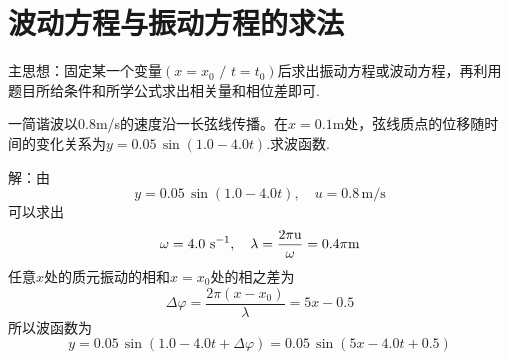 \section{波动方程与振动方程的求法}
主思想：固定某一个变量$(x=x_0\,\,/\,\,t=t_0)$后求出振动方程或波动方程，再利用题目所给条件和所学公式求出相关量和相位差即可.\jg
\par \dya[例1] 一简谐波以0.8m/s的速度沿一长弦线传播。在$x=0.1$m处，弦线质点的位移随时间的变化关系为$y=0.05\,\sin (1.0-4.0t)$.求波函数.\jg\jg 
\par 解：由
\begin{equation*}
y=0.05\,\sin (1.0-4.0t),\quad u=0.8\,\text{m/s}
\end{equation*}
可以求出
\begin{equation*}
\omega = 4.0\,\,\rm{s}^{-1},\quad \lambda = \frac{2\pi u}{\omega}=0.4\pi \rm{m}
\end{equation*}
任意$x$处的质元振动的相和$x=x_0$处的相之差为
\begin{equation*}
\Delta \varphi = \frac{2\pi (x-x_0)}{\lambda}=5x-0.5
\end{equation*}
所以波函数为
\begin{equation*}
y=0.05\,\sin (1.0-4.0t+\Delta \varphi )=0.05\,\sin (5x-4.0t+0.5 )
\end{equation*}